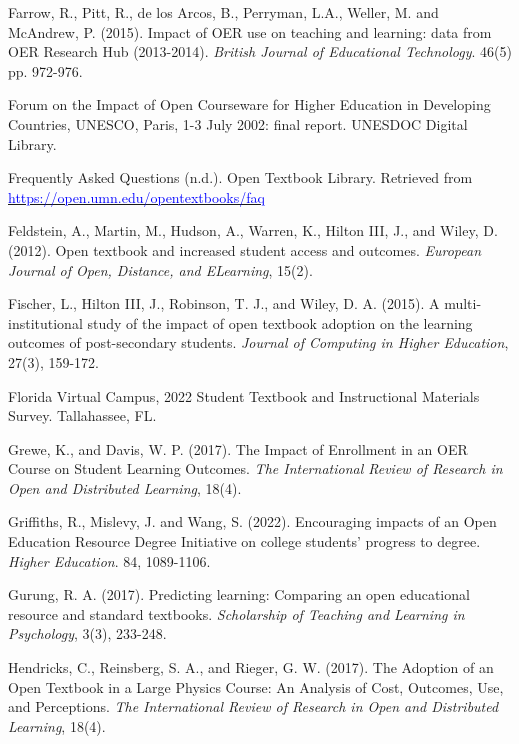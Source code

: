 \documentclass[11pt]{article}
\newcommand{\alink}[2]{\href{#1}{\textcolor{blue}{#2}}}
\begin{document}
\begin{thebibliography}{99}
   Farrow, R., Pitt, R., de los Arcos, B., Perryman, L.A., Weller, M. and McAndrew, P. (2015). Impact of OER use on teaching and learning: data from OER Research Hub (2013-2014). {\em British Journal of Educational Technology}. 46(5) pp. 972-976.

   Forum on the Impact of Open Courseware for Higher Education in Developing Countries, UNESCO, Paris, 1-3 July 2002: final report.  UNESDOC Digital Library.%

   Frequently Asked Questions (n.d.). Open Textbook Library. Retrieved from \alink{https://open.umn.edu/opentextbooks/faq}{https://open.umn.edu/opentextbooks/faq}

   Feldstein, A., Martin, M., Hudson, A., Warren, K., Hilton III, J., and Wiley, D. (2012). Open textbook and increased student access and outcomes. {\em European Journal of Open, Distance, and ELearning}, 15(2).

   Fischer, L., Hilton III, J., Robinson, T. J., and Wiley, D.
  A. (2015). A multi-institutional study of the impact of open textbook adoption on the learning outcomes of post-secondary students. {\em Journal of Computing in Higher Education}, 27(3), 159-172.

   Florida Virtual Campus, 2022 Student Textbook and Instructional Materials Survey. Tallahassee, FL. %

   Grewe, K., and Davis, W. P. (2017). The Impact of Enrollment in an OER Course on Student Learning Outcomes. {\em The International Review of Research in Open and Distributed Learning}, 18(4).

   Griffiths, R., Mislevy, J. and Wang, S. (2022). Encouraging impacts of an Open Education Resource Degree Initiative on college students’ progress to degree. {\em Higher Education}. 84, 1089-1106.

   Gurung, R. A. (2017). Predicting learning: Comparing an open educational resource and standard textbooks. {\em Scholarship of Teaching and Learning in Psychology}, 3(3), 233-248.

   Hendricks, C., Reinsberg, S. A., and Rieger, G. W. (2017). The Adoption of an Open Textbook in a Large Physics Course: An Analysis of Cost, Outcomes, Use, and Perceptions. {\em The International Review of Research in Open and Distributed Learning}, 18(4).


\end{thebibliography}
\end{document}

